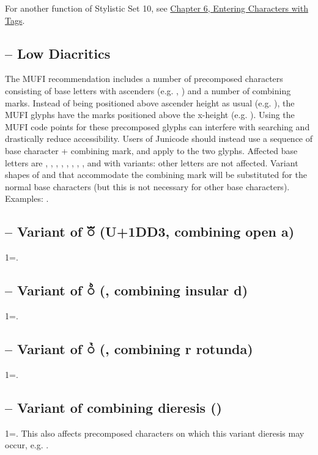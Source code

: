 \noindent For another function of Stylistic Set 10, see
\hyperlink{tagchapter}{Chapter 6, Entering Characters with Tags}.

\subsection{ – Low Diacritics}
The MUFI recommendation includes a number of precomposed characters consisting of
base letters with ascenders (e.g. , ) and a number of combining marks.
Instead of being positioned above ascender height as usual (e.g.
), the MUFI glyphs have the marks positioned above the x-height
(e.g. ).
Using the MUFI code points for these precomposed glyphs can interfere with searching
and drastically reduce accessibility. Users of Junicode should instead use a sequence of base character + combining
mark, and apply  to the two glyphs. Affected base letters are
, , , , , , , ,
and  with variants: other letters are not affected.
Variant shapes of  and \textex{{\dh}}
that accommodate the combining mark will be substituted for the normal base characters (but this is not necessary for
other base characters). Examples:
.

\subsection{ – Variant of ◌ᷓ (U+1DD3, combining open a)}
1=.

\subsection{ – Variant of ◌ᷘ (, combining insular
d)}
1=.

\subsection{ – Variant of ◌ᷣ (, combining r rotunda)}
1=.

\subsection{ – Variant of combining dieresis ()}
1=. This also affects precomposed characters on which this variant dieresis may occur, e.g.
.

